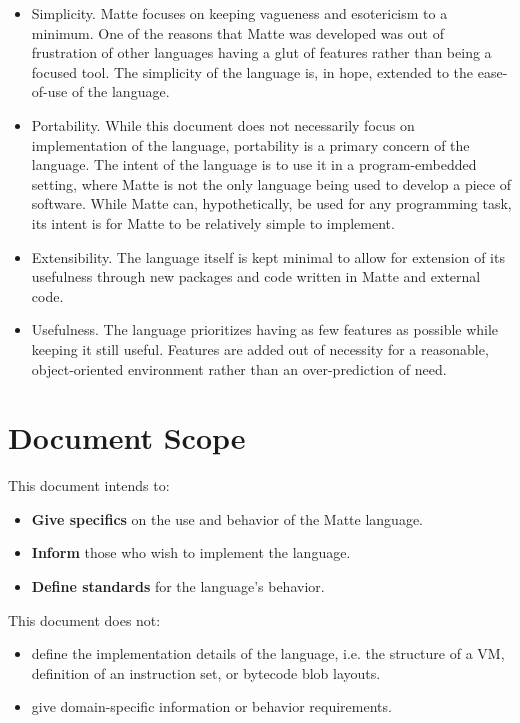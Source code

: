 \documentclass[12pt,letterpaper]{report}
\begin{document}
\begin{itemize}
\item Simplicity. Matte focuses on keeping vagueness and esotericism to a minimum. One 
  of the reasons that Matte was developed was out of frustration of other 
  languages having a glut of features rather than being a focused tool. The 
  simplicity of the language is, in hope, extended to the ease-of-use of the language.

\item Portability. While this document does not necessarily focus on implementation 
  of the language, portability is a primary concern of the language. 
  The intent of the language is to use it in a program-embedded setting, 
  where Matte is not the only language being used to develop a piece of software. 
  While Matte can, hypothetically, be used for any programming task, its intent is 
  for Matte to be relatively simple to implement. 

\item Extensibility. The language itself is kept minimal to allow for extension of its 
  usefulness through new packages and code written in Matte and external code.

\item Usefulness. The language prioritizes having as few features as possible 
  while keeping it still useful. Features are added out of necessity for a reasonable, 
  object-oriented environment rather than an over-prediction of need.


\end{itemize}

\section{Document Scope}\label{Document Scope}

This document intends to:
\begin{itemize}
\item \textbf{Give specifics} on the use and behavior of the Matte language. 
\item \textbf{Inform} those who wish to implement the language.
\item \textbf{Define standards} for the language's behavior.
\end{itemize}
This document does not:
\begin{itemize}
\item define the implementation details of the language, i.e. the 
      structure of a VM, definition of an instruction set, or bytecode blob layouts.
\item give domain-specific information or behavior requirements.
\end{itemize}
\end{document}
